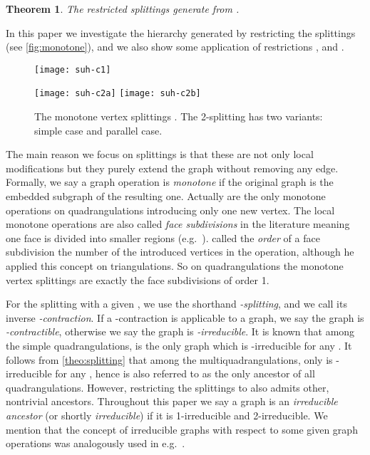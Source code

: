 \documentclass[]{article}
\newtheorem{theo}{Theorem}\newtheorem{prop}{Proposition}\newtheorem*{prop*}{Proposition}\newtheorem{coro}{Corollary}\newtheorem{lemm}{Lemma}\theoremstyle{definition}
\begin{document}
\begin{theo}
\label{theo:splitting}
The restricted splittings  generate  from . \end{theo}

In this paper we investigate the hierarchy generated by restricting the splittings  (see \autoref{fig:monotone}), and we also show some application of restrictions ,  and .
\begin{figure}\centering
    \texttt{[image: suh-c1]}

    \texttt{[image: suh-c2a]}
    \qquad
    \texttt{[image: suh-c2b]}
\caption{The monotone vertex splittings . The 2-splitting has two variants: simple case and parallel case.}
  \label{fig:monotone}
\end{figure}
The main reason we focus on splittings  is that these are not only local modifications but they purely extend the graph without removing any edge.
Formally, we say a graph operation is \emph{monotone} if the original graph is the embedded subgraph of the resulting one.
Actually  are the only monotone operations on quadrangulations introducing only one new vertex.
The local monotone operations are also called \emph{face subdivisions} in the literature meaning one face is divided into smaller regions (e.g.\  \cite{Tutte1963,Mohar2010}).
\citet{Tutte1963} called the \emph{order} of a face subdivision the number of the introduced vertices in the operation, although he applied this concept on triangulations.
So on quadrangulations the monotone vertex splittings are exactly the face subdivisions of order 1.

For the splitting  with a given , we use the shorthand \emph{-splitting}, and we call its inverse \emph{-contraction}.
If a -contraction is applicable to a graph, we say the graph is \emph{-contractible}, otherwise we say the graph is \emph{-irreducible}.
It is known that among the simple quadrangulations,  is the only graph which is -irreducible for any  \cite{Batagelj1989, Negami1993}.
It follows from \autoref{theo:splitting}
 that among the multiquadrangulations, only  is -irreducible for any , hence  is also referred to as the only ancestor of all quadrangulations.
However, restricting the splittings to  also admits other, nontrivial ancestors.
Throughout this paper we say a graph is an \emph{irreducible ancestor} (or shortly \emph{irreducible}) if it is 1-irreducible and 2-irreducible.
We mention that the concept of irreducible graphs with respect to some given graph operations was analogously used in e.g.\  \cite{Negami1993, Nakamoto1996b}.
\end{document}
